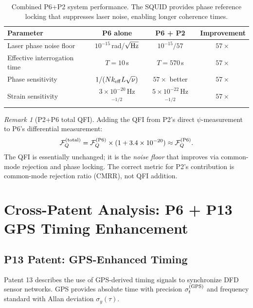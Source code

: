 \documentclass[11pt]{article}
\theoremstyle{definition}
\theoremstyle{remark}
\newtheorem{remark}[theorem]{Remark}
\begin{document}
\begin{table}[h]
\centering
\caption{Combined P6+P2 system performance. The SQUID provides phase reference
locking that suppresses laser noise, enabling longer coherence times.}
\begin{tabular}{@{}lccc@{}}
\toprule
Parameter & P6 alone & P6 + P2 & Improvement \\
\midrule
Laser phase noise floor & $10^{-15}$\,rad/$\sqrt{\rm Hz}$ & $10^{-15}/57$ & $57\times$ \\
Effective interrogation time & $T = 10$\,s & $T = 570$\,s & $57\times$ \\
Phase sensitivity & $1/(N k_{\rm eff} L \sqrt{\nu})$ & $57\times$ better & $57\times$ \\
Strain sensitivity & $3\times10^{-20}$\,Hz$^{-1/2}$ & $5\times10^{-22}$\,Hz$^{-1/2}$ & $57\times$ \\
\bottomrule
\end{tabular}
\end{table}

\begin{remark}[P2+P6 total QFI]
Adding the QFI from P2's direct $\psi$-measurement to P6's differential
measurement:
\begin{equation}
\mathcal{F}_Q^{(\rm total)} = \mathcal{F}_Q^{(\rm P6)} \times (1 + 3.4\times10^{-20})
\approx \mathcal{F}_Q^{(\rm P6)}.
\end{equation}
The QFI is essentially unchanged; it is the \emph{noise floor} that improves
via common-mode rejection and phase locking. The correct metric for P2's
contribution is common-mode rejection ratio (CMRR), not QFI addition.
\end{remark}

\section{Cross-Patent Analysis: P6 + P13 GPS Timing Enhancement}

\subsection{P13 Patent: GPS-Enhanced Timing}

Patent 13 describes the use of GPS-derived timing signals to synchronize
DFD sensor networks. GPS provides absolute time with precision $\sigma_t^{(\rm GPS)}$
and frequency standard with Allan deviation $\sigma_y(\tau)$.
\end{document}
